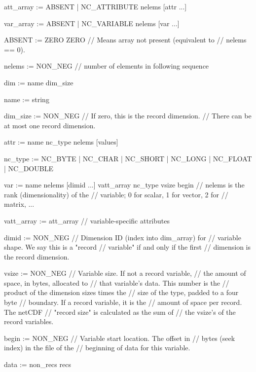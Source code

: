 {att_array  :=  ABSENT | NC_ATTRIBUTE  nelems  [attr ...]

var_array  :=  ABSENT | NC_VARIABLE   nelems  [var ...]

ABSENT  := ZERO  ZERO     // Means array not present (equivalent to
                          // nelems == 0).

nelems  := NON_NEG        // number of elements in following sequence

dim     := name  dim_size

name    := string

dim_size := NON_NEG       // If zero, this is the record dimension.
                          // There can be at most one record dimension.

attr    := name  nc_type  nelems  [values]

nc_type := NC_BYTE | NC_CHAR | NC_SHORT | NC_LONG | NC_FLOAT | NC_DOUBLE

var     := name  nelems  [dimid ...]  vatt_array  nc_type  vsize  begin
                          // nelems is the rank (dimensionality) of the
                          // variable; 0 for scalar, 1 for vector, 2 for
                          // matrix, ...

vatt_array :=  att_array  // variable-specific attributes

dimid   := NON_NEG        // Dimension ID (index into dim_array) for
                          // variable shape.  We say this is a "record
                          // variable" if and only if the first
                          // dimension is the record dimension.

vsize    := NON_NEG       // Variable size.  If not a record variable,
                          // the amount of space, in bytes, allocated to
                          // that variable's data.  This number is the
                          // product of the dimension sizes times the
                          // size of the type, padded to a four byte
                          // boundary.  If a record variable, it is the
                          // amount of space per record.  The netCDF
                          // "record size" is calculated as the sum of
                          // the vsize's of the record variables.

begin   := NON_NEG        // Variable start location.  The offset in
                          // bytes (seek index) in the file of the
                          // beginning of data for this variable.

data    := non_recs  recs

}

